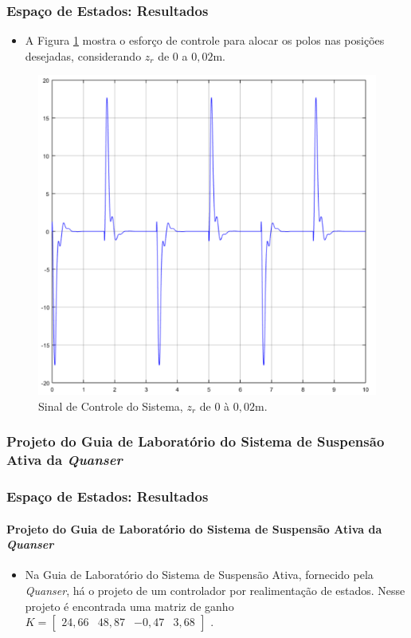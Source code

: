\documentclass{beamer}
\begin{document}
\begin{frame}
\frametitle{Espaço de Estados: Resultados}
\begin{itemize}
\item A Figura \ref{sinalcontroleEE2} mostra o esforço de controle para alocar os polos nas posições desejadas, considerando $z_r$ de $0$ a $0,02$m.
\end{itemize}
\begin{figure}[H]
	\centering
\includegraphics[width=.45\columnwidth]{./imagens/sinal_controle_sistema2.pdf}
    \renewcommand{\figurename}{Fig. 18}
    \caption{Sinal de Controle do Sistema, $z_r$ de $0$ à $0,02$m.}
	\label{sinalcontroleEE2}
\end{figure}
\end{frame}

\subsubsection{Projeto do Guia de Laboratório do Sistema de Suspensão Ativa da \protect\textit{Quanser}}
\begin{frame}
\frametitle{Espaço de Estados: Resultados}
\framesubtitle{Projeto do Guia de Laboratório do Sistema de Suspensão Ativa da \protect\textit{Quanser}}
\begin{itemize}
\item Na Guia de Laboratório do Sistema de Suspensão Ativa, fornecido pela \textit{Quanser}, há o projeto de um controlador por realimentação de estados. Nesse projeto é encontrada uma matriz de ganho $K = \left[\begin{matrix}
24,66 & 48,87 & -0,47 & 3,68 \end{matrix}\right]$ \cite{quanser}.
\end{itemize}
\end{frame}
\end{document}
